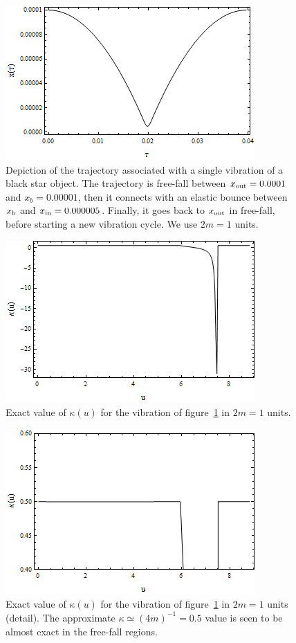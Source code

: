 \documentclass[12pt]{article}
\begin{document}
\begin{figure}
\begin{center}
 \includegraphics[width=0.6\columnwidth]{bounce}
  \caption{Depiction of the trajectory associated with a single vibration of a black star object. The trajectory is free-fall between $x_{\rm out} = 0.0001$ and $x_b = 0.00001$, then it connects with an elastic bounce between $x_{\rm b}$ and $x_{\rm in} = 0.000005$. Finally, it goes back to $x_{\rm out}$ in free-fall, before starting a new vibration cycle. We use $2m = 1$ units.}\label{fig:bounce}
\end{center}
 \end{figure}
 
\begin{figure}
\begin{center}
 \includegraphics[width=0.6\columnwidth]{kappa}
  \caption{Exact value of $\kappa (u)$ for the vibration of figure~\ref{fig:bounce} in $2m = 1$ units.}\label{fig:kappa}
\end{center}
 \end{figure}
 
\begin{figure}
\begin{center}
 \includegraphics[width=0.6\columnwidth]{kappa-zoom}
  \caption{Exact value of $\kappa (u)$ for the vibration of figure~\ref{fig:bounce} in $2m = 1$ units (detail). The approximate $\kappa \simeq (4m)^{-1} = 0.5$ value is seen to be almost exact in the free-fall regions.}\label{fig:kappa-zoom}
\end{center}
 \end{figure}
\end{document}
